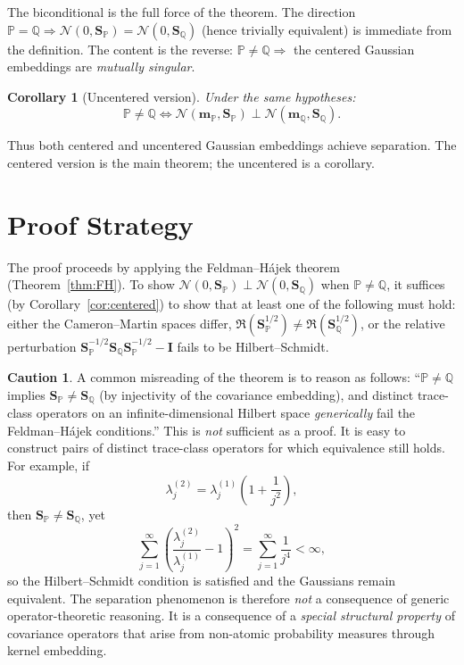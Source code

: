 \documentclass[12pt, oneside]{book}
\theoremstyle{plain}
\newtheorem{corollary}[theorem]{Corollary}
\theoremstyle{definition}
\newtheorem{caution}[theorem]{Caution}
\newcommand{\calN}{\mathcal{N}}
\newcommand{\PP}{\mathbb{P}}
\newcommand{\QQ}{\mathbb{Q}}
\newcommand{\ran}{\mathfrak{R}}
\newcommand{\mP}{\mathbf{m}_{\PP}}
\newcommand{\mQ}{\mathbf{m}_{\QQ}}
\newcommand{\SP}{\mathbf{S}_{\PP}}
\newcommand{\SQ}{\mathbf{S}_{\QQ}}
\begin{document}
\noindent The biconditional is the full force of the theorem. The direction $\PP = \QQ \Rightarrow \calN(0, \SP) = \calN(0, \SQ)$ (hence trivially equivalent) is immediate from the definition. The content is the reverse: $\PP \neq \QQ \Rightarrow$ the centered Gaussian embeddings are \emph{mutually singular}.

\begin{corollary}[Uncentered version]
\label{cor:uncentered}
Under the same hypotheses:
\begin{equation}
\PP \neq \QQ \iff \calN(\mP, \SP) \perp \calN(\mQ, \SQ).
\label{eq:separation_uncentered}
\end{equation}
\end{corollary}

Thus both centered and uncentered Gaussian embeddings achieve separation. The centered version is the main theorem; the uncentered is a corollary.

\section{Proof Strategy}

The proof proceeds by applying the Feldman--H\'ajek theorem (Theorem~\ref{thm:FH}). To show $\calN(0, \SP) \perp \calN(0, \SQ)$ when $\PP \neq \QQ$, it suffices (by Corollary~\ref{cor:centered}) to show that at least one of the following must hold: either the Cameron--Martin spaces differ, $\ran(\SP^{1/2}) \neq \ran(\SQ^{1/2})$, or the relative perturbation $\SP^{-1/2} \SQ \SP^{-1/2} - \mathbf{I}$ fails to be Hilbert--Schmidt.

\begin{caution}
A common misreading of the theorem is to reason as follows: ``$\PP \neq \QQ$ implies $\SP \neq \SQ$ (by injectivity of the covariance embedding), and distinct trace-class operators on an infinite-dimensional Hilbert space \emph{generically} fail the Feldman--H\'ajek conditions.'' This is \emph{not} sufficient as a proof. It is easy to construct pairs of distinct trace-class operators for which equivalence still holds. For example, if
\begin{equation}
\lambda_j^{(2)} = \lambda_j^{(1)}\!\left(1 + \frac{1}{j^2}\right),
\end{equation}
then $\SP \neq \SQ$, yet
\begin{equation}
\sum_{j=1}^{\infty} \left(\frac{\lambda_j^{(2)}}{\lambda_j^{(1)}} - 1\right)^2 = \sum_{j=1}^{\infty} \frac{1}{j^4} < \infty,
\end{equation}
so the Hilbert--Schmidt condition is satisfied and the Gaussians remain equivalent. The separation phenomenon is therefore \emph{not} a consequence of generic operator-theoretic reasoning. It is a consequence of a \emph{special structural property} of covariance operators that arise from non-atomic probability measures through kernel embedding.
\end{caution}
\end{document}
